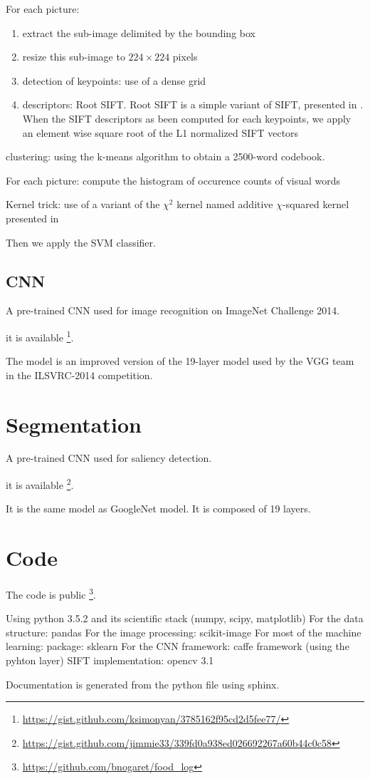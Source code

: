 For each picture:
\begin{enumerate}
    \item extract the sub-image delimited by the bounding box
    \item resize this sub-image to $224 \times 224$ pixels
    \item detection of keypoints: use of a dense grid
    \item descriptors: Root SIFT. Root SIFT is a simple variant of SIFT, presented in \cite{Arandjelovic2012}. When the SIFT descriptors as been computed for each keypoints, we apply an element wise square root of the L1 normalized SIFT vectors
\end{enumerate}

clustering: using the k-means algorithm to obtain a 2500-word codebook.

For each picture:
compute the histogram of occurence counts of visual words

Kernel trick: use of a variant of the $\chi^2$ kernel named additive $\chi$-squared kernel presented in \cite{Vedaldi2010}

Then we apply the SVM classifier.

\subsection{CNN}

A pre-trained CNN used for image recognition on ImageNet Challenge 2014.

\cite{Simonyan2014}

it is available \footnote{\url{https://gist.github.com/ksimonyan/3785162f95cd2d5fee77/}}.

The model is an improved version of the 19-layer model used by the VGG team in the ILSVRC-2014 competition.

\section{Segmentation}

A pre-trained CNN used for saliency detection.

\cite{zhang2015SOD}

it is available \footnote{\url{https://gist.github.com/jimmie33/339fd0a938ed026692267a60b44c0c58}}.

It is the same model as GoogleNet model. It is composed of 19 layers.

\section{Code}

The code is public \footnote{\url{https://github.com/bnogaret/food_log}}.

Using python 3.5.2 and its scientific stack (numpy, scipy, matplotlib)
For the data structure: pandas \cite{McKinney2010}
For the image processing: scikit-image \cite{VanderWalt2014}
For most of the machine learning: package: sklearn \cite{Pedregosa2012}
For the CNN framework: caffe framework \cite{Jia2014a} (using the pyhton layer)
SIFT implementation: opencv 3.1 \cite{Bradski2000}

Documentation is generated from the python file using sphinx.